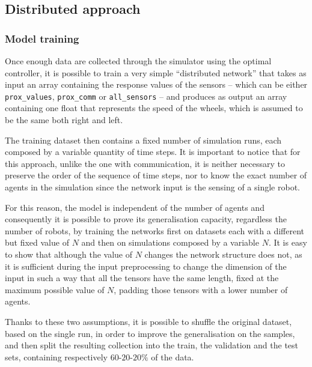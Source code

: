 \subsection{Distributed approach}
\label{subsec:ex1distr}

\subsubsection{Model training}
\label{subsubsec:learneddist}

Once enough data are collected through the simulator using the optimal 
controller, it is possible to train a very simple ``distributed network'' 
that takes as input an array containing the response values of the sensors – 
which can be either \texttt{prox\_values}, \texttt{prox\_comm} or 
\texttt{all\_sensors} – and produces as output an array containing one float 
that represents the speed of the wheels, which is assumed to be the same 
both right and left.

The training dataset then contains a fixed number of simulation runs, each 
composed by a variable quantity of time steps. It is important to notice that 
for this approach, unlike the one with communication, it is neither necessary to 
preserve the order of the sequence of time steps, nor to know the exact number 
of agents in the simulation since the network input is the sensing of a single robot.

For this reason, the model is independent of the number of agents and 
consequently it is possible to prove its generalisation capacity, regardless 
the number of robots, by training the networks first on datasets each with a 
different but fixed value of $N$ and then on simulations composed by a 
variable $N$.
It is easy to show that although the value of $N$ changes the network 
structure does not, as it is sufficient during the input preprocessing to 
change the dimension of the input in such a way that all the tensors have 
the same length, fixed at the maximum possible value of $N$, padding 
those tensors with a lower number of agents.

Thanks to these two assumptions, it is possible to shuffle the original 
dataset, based on the single run, in order to improve the generalisation on 
the samples, and then split the resulting collection into the train, the 
validation and the test sets, containing respectively $60$-$20$-$20\%$ of 
the data. 

